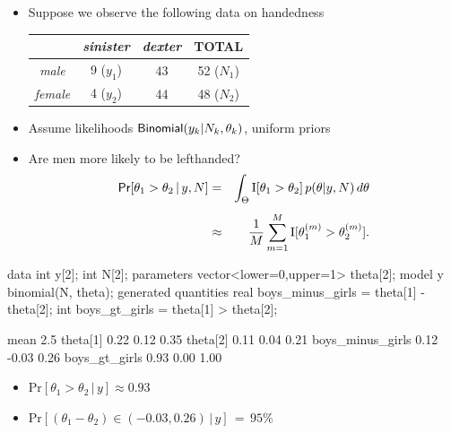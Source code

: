 \documentclass[10pt]{report}
\begin{document}


%
\vspace*{-4pt}
\begin{itemize}
\item Suppose we observe the following data on handedness
\begin{center}
{\small
\begin{tabular}{c|c|c||c}
     & {\slshape sinister} & {\slshape dexter} & TOTAL
\\ \hline \hline
{\slshape male} & 9 ($y_1$) & 43 & 52 ($N_1$)
\\
{\slshape female} & 4 ($y_2$) & 44 & 48 ($N_2$)
\end{tabular}
}
\end{center}
\item Assume likelihoods $\text{\sf Binomial}(y_k|N_k,\theta_k)$, uniform
  priors
\item Are men more likely to be lefthanded?
{\small
\begin{eqnarray*}
\text{\sf Pr}[\theta_1 > \theta_2 \, | \, y, N]
& = &
\int_{\Theta} \text{I}[\theta_1 > \theta_2] \, p(\theta|y,N) \,
d\theta
\\[4pt]
& \approx & \frac{1}{M} \sum_{m=1}^M \text{I}[\theta_1^{(m)} > \theta_2^{(m)}].
\end{eqnarray*}
}
\end{itemize}


%
\begin{stancode}
data {
  int y[2];
  int N[2];
}
parameters {
  vector<lower=0,upper=1> theta[2];
}
model {
  y ~ binomial(N, theta);
}
generated quantities {
  real boys_minus_girls = theta[1] - theta[2];
  int boys_gt_girls = theta[1] > theta[2];
}
\end{stancode}


%
\begin{codeout}
                   mean    2.5%
theta[1]           0.22    0.12   0.35
theta[2]           0.11    0.04   0.21
boys_minus_girls   0.12   -0.03   0.26
boys_gt_girls      0.93    0.00   1.00
\end{codeout}
\begin{itemize}
\item
$\mathrm{Pr}[\theta_1 > \theta_2 \,|\, y] \approx 0.93$
\item
$\mathrm{Pr}\left[
(\theta_1 - \theta_2) \in (-0.03, 0.26)
\,|\, y
\right]
\, = \, 95\%$
\end{itemize}
\end{document}
